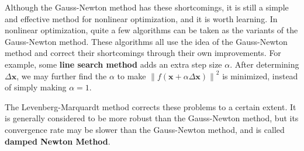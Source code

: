 Although the Gauss-Newton method has these shortcomings, it is still a simple and effective method for nonlinear optimization, and it is worth learning. In nonlinear optimization, quite a few algorithms can be taken as the variants of the Gauss-Newton method. These algorithms all use the idea of the Gauss-Newton method and correct their shortcomings through their own improvements. For example, some \textbf{line search method} adds an extra step size $\alpha$. After determining $\Delta \bm{x}$, we may further find the $\alpha$ to make $\left\| f (\bm{x} + \alpha \Delta \bm{ x}) \right\|^2$ is minimized, instead of simply making $\alpha = 1$.

The Levenberg-Marquardt method corrects these problems to a certain extent. It is generally considered to be more robust than the Gauss-Newton method, but its convergence rate may be slower than the Gauss-Newton method, and is called \textbf{damped Newton Method}.


